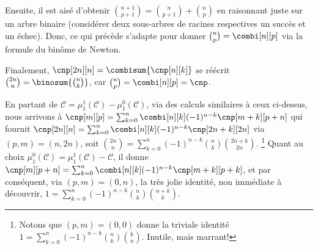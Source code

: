 Ensuite,
il est aisé d'obtenir
$\binom{n+1}{p+1} = \binom{n}{p+1} + \binom{n}{p}$
en raisonnant juste sur un arbre binaire (considérer deux sous-arbres de racines respectives un succès et un échec).
%
Donc, ce qui précède s'adapte pour donner $\binom{n}{p} = \combi[n][p]$ via la formule du binôme de Newton.

Finalement,
$\cnp[2n][n] = \combisum{\cnp[n][k]}$
se réécrit
$\binom{2n}{n} = \binosum{\binom{n}{k}}$,
car
$\binom{n}{p} = \combi[n][p] = \cnp$.




\begin{remark}
	En partant de
	$\mathcal{C} = \mu_1^1(\mathcal{C}) - \mu_1^0(\mathcal{C})$,
	via des calculs similaires à ceux ci-dessus,
	nous arrivons à
    $\cnp[m][p] = \sum_{k=0}^n \combi[n][k] (-1)^{n-k} \cnp[m+k][p+n]$
    qui fournit 
    $\cnp[2n][n] = \sum_{k=0}^n \combi[n][k] (-1)^{n-k} \cnp[2n+k][2n]$
    via $(p,m) = (n,2n)$,
    soit
    $\binom{2n}{n} = \sum_{k=0}^n (-1)^{n-k} \binom{n}{k} \binom{2n+k}{2n}$.%
    \footnote{
		Notons que $(p,m) = (0,0)$ donne la triviale identité
		$1 = \sum_{k=0}^n (-1)^{n-k} \binom{n}{k} \binom{k}{n}$.
		Inutile, mais marrant!
	}
    Quant au choix
	$\mu_1^0(\mathcal{C}) = \mu_1^1(\mathcal{C}) - \mathcal{C}$,
	il donne
    $\cnp[m][p+n] = \sum_{k=0}^n \combi[n][k] (-1)^{n-k} \cnp[m+k][p+k]$,
    et par conséquent, via $(p,m) = (0,n)$, la très jolie identité, non immédiate à découvrir,
    $1 = \sum_{k=0}^n (-1)^{n-k} \binom{n}{k} \binom{n+k}{k}$.
\end{remark}
